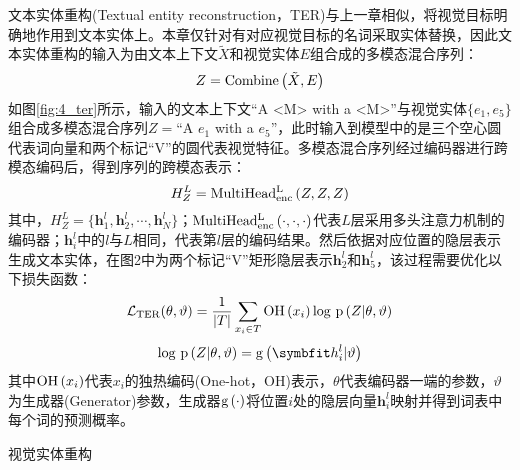 
文本实体重构(Textual entity reconstruction，TER)与上一章相似，将视觉目标明确地作用到文本实体上。本章仅针对有对应视觉目标的名词采取实体替换，因此文本实体重构的输入为由文本上下文$\tilde{X}$和视觉实体$E$组合成的多模态混合序列：
\begin{equation}
Z={\rm{Combine}} \left( \tilde{X}, E \right)
\end{equation}
如图\ref{fig:4_ter}所示，输入的文本上下文“A <M> with a <M>”与视觉实体$\{e_1,e_5\}$组合成多模态混合序列$Z=$“A $e_1$ with a $e_5$”，此时输入到模型中的是三个空心圆代表词向量和两个标记“V”的圆代表视觉特征。多模态混合序列经过编码器进行跨模态编码后，得到序列的跨模态表示：
\begin{equation}
H_Z^L={\rm{MultiHead_{enc}^L}} \left( Z, Z, Z \right)
\end{equation}
其中，$H_Z^L=\{{\boldsymbol{h}_1^l},{\boldsymbol{h}_2^l},\cdots,{\boldsymbol{h}_N^l}\}$；${\rm{MultiHead_{enc}^L}} \left( \cdot,\cdot,\cdot \right)$代表$L$层采用多头注意力机制的编码器；$\boldsymbol{h}_i^l$中的$l$与$L$相同，代表第$l$层的编码结果。然后依据对应位置的隐层表示生成文本实体，在图2中为两个标记“V”矩形隐层表示${\boldsymbol{h}_2^l}$和${\boldsymbol{h}_5^l}$，该过程需要优化以下损失函数：
\begin{equation}
\mathcal{L}_{\rm{TER}} (\theta, \vartheta) =
    \frac{1}{{\vert}T{\vert}}
    \mathop{\sum}_{x_i \in T}
    {\rm{OH}} \left( x_i \right)
    {\rm log}{\ }{\rm p} \left( Z {\vert} \theta, \vartheta \right)
\end{equation}
\begin{equation}
{\log}{\ }{\rm p} \left( Z {\vert} \theta, \vartheta \right) =
    {\rm{g}} \left( {\boldsymbol h_i^l} \vert \vartheta \right)
\end{equation}
其中${\rm{OH}}\left(x_i\right)$代表$x_i$的独热编码(One-hot，OH)表示，$\theta$代表编码器一端的参数，$\vartheta$为生成器(Generator)参数，生成器${\rm{g}}\left(\cdot\right)$将位置$i$处的隐层向量${\boldsymbol{h}_i^l}$映射并得到词表中每个词的预测概率。

{\sffamily 视觉实体重构}

